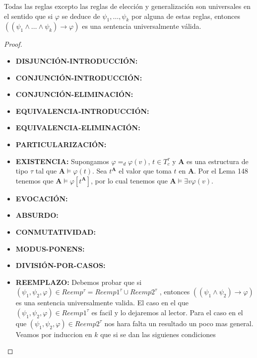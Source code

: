   \begin{lemma} \label{lemma_67}
    \PN Todas las reglas excepto las reglas de elección y generalización son universales en el sentido que si $\varphi$
    se deduce de $\psi_{1}, \dotsc, \psi_{k}$ por alguna de estas reglas, entonces $\left((\psi_{1} \wedge \dotsc \wedge
    \psi_{k}) \rightarrow \varphi \right)$ es una sentencia universalmente válida.
  \end{lemma}
  \begin{proof}
    \begin{itemize}
      \item \textbf{DISJUNCIÓN-INTRODUCCIÓN:}
      \item \textbf{CONJUNCIÓN-INTRODUCCIÓN:}
      \item \textbf{CONJUNCIÓN-ELIMINACIÓN:}
      \item \textbf{EQUIVALENCIA-INTRODUCCIÓN:}
      \item \textbf{EQUIVALENCIA-ELIMINACIÓN:}
      \item \textbf{PARTICULARIZACIÓN:}

      \item \textbf{EXISTENCIA:} Supongamos $\varphi =_{d}\varphi (v)$, $t\in T_{c}^{\tau }$ y $\mathbf{A}$ es una
      estructura de tipo $\tau $ tal que $\mathbf{A}\models \varphi (t)$. Sea $t^{\mathbf{A}}$ el valor que toma $t$ en
      $\mathbf{A}$. Por el Lema 148 tenemos que $\mathbf{A}\models \varphi \left\lbrack t^{\mathbf{A}}\right\rbrack $,
      por lo cual tenemos que $\mathbf{A}\models \exists v\varphi (v)$.

      \item \textbf{EVOCACIÓN:}
      \item \textbf{ABSURDO:}
      \item \textbf{CONMUTATIVIDAD:}
      \item \textbf{MODUS-PONENS:}
      \item \textbf{DIVISIÓN-POR-CASOS:}

      \item \textbf{REEMPLAZO:} Debemos probar que si $(\psi_{1},\psi_{2},\varphi )\in Reemp^{\tau }=Reemp1^{\tau }\cup Reemp2^{\tau }$ , entonces $\left( (\psi_{1}\wedge \psi_{2})\rightarrow \varphi \right) $ es una sentencia universalmente valida. El caso en el que $(\psi_{1},\psi_{2},\varphi )\in Reemp1^{\tau }$ es facil y lo dejaremos al lector. Para el caso en el que $(\psi_{1},\psi_{2},\varphi )\in Reemp2^{\tau }$ nos hara falta un resultado un poco mas general. Veamos por induccion en $k$ que si se dan las siguienes condiciones


\end{itemize}
\end{proof}
